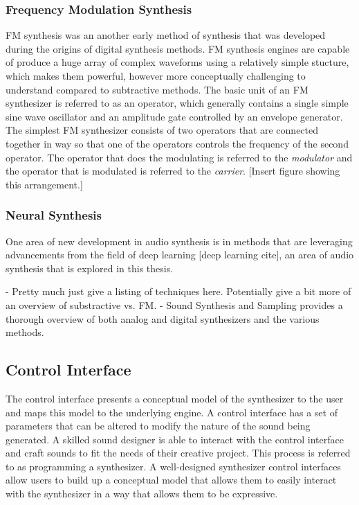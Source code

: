 \subsubsection{Frequency Modulation Synthesis}
FM synthesis was an another early method of synthesis that was developed during the origins of digital synthesis methods. FM synthesis engines are capable of produce a huge array of complex waveforms using a relatively simple stucture, which makes them powerful, however more conceptually challenging to understand compared to subtractive methods. The basic unit of an FM synthesizer is referred to as an operator, which generally contains a single simple sine wave oscillator and an amplitude gate controlled by an envelope generator. The simplest FM synthesizer consists of two operators that are connected together in way so that one of the operators controls the frequency of the second operator. The operator that does the modulating is referred to the \textit{modulator} and the operator that is modulated is referred to the \textit{carrier}. [Insert figure showing this arrangement.]

\subsubsection{Neural Synthesis}
One area of new development in audio synthesis is in methods that are leveraging advancements from the field of deep learning [deep learning cite], an area of audio synthesis that is explored in this thesis.  


- Pretty much just give a listing of techniques here. Potentially give a bit more of an overview of substractive vs. FM.
- Sound Synthesis and Sampling provides a thorough overview of both analog and digital synthesizers and the various methods. \cite{russ2012sound}

\subsection{Control Interface}
The control interface presents a conceptual model of the synthesizer to the user and maps this model to the underlying engine. A control interface has a set of parameters that can be altered to modify the nature of the sound being generated. A skilled sound designer is able to interact with the control interface and craft sounds to fit the needs of their creative project. This process is referred to as programming a synthesizer. A well-designed synthesizer control interfaces allow users to build up a conceptual model that allows them to easily interact with the synthesizer in a way that allows them to be expressive. 

